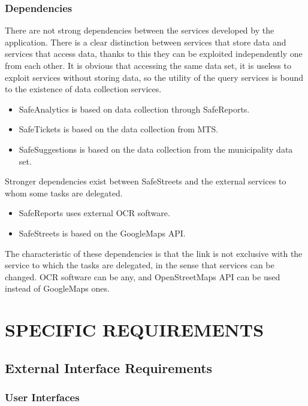 \documentclass[a4paper]{article}
\begin{document}
\subsubsection{Dependencies}

There are not strong dependencies between the services developed by the
application. There is a clear distinction between services that store
data and services that access data, thanks to this they can be exploited
independently one from each other. It is obvious that accessing the same
data set, it is useless to exploit services without storing data, so the
utility of the query services is bound to the existence of data
collection services.

\begin{itemize}
\item
  SafeAnalytics is based on data collection through SafeReports.
\item
  SafeTickets is based on the data collection from MTS.
\item
  SafeSuggestions is based on the data collection from the municipality
  data set.
\end{itemize}

Stronger dependencies exist between SafeStreets and the external
services to whom some tasks are delegated.

\begin{itemize}
\item
  SafeReports uses external OCR software.
\item
  SafeStreets is based on the GoogleMaps API.
\end{itemize}

The characteristic of these dependencies is that the link is not
exclusive with the service to which the tasks are delegated, in the
sense that services can be changed. OCR software can be any, and
OpenStreetMaps API can be used instead of GoogleMaps ones.

\newpage

\section{SPECIFIC REQUIREMENTS}\label{specific_requirements}

\subsection{External Interface Requirements}

\subsubsection{User Interfaces}
\end{document}
